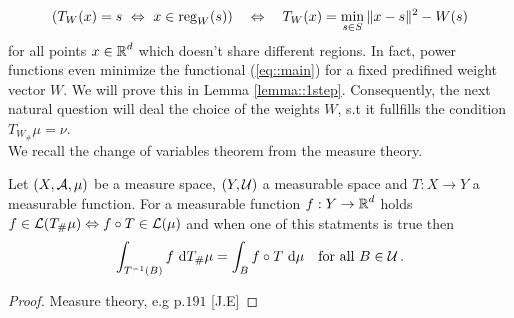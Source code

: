 \documentclass[
     12pt,         %
     a4paper,      %
     BCOR=10mm,     %
     DIV=14,        %
     ]{scrreprt}
\begin{document}
    \begin{align}
        ( T_W(x) = s \  \Leftrightarrow \ x\in \operatorname{reg}_W(s) ) \quad \Leftrightarrow \quad T_W(x) = \min_{s\in S} \|x-s\|^2 - W(s) \label{eq::minimalityPower}
    \end{align}
    for all points $x \in \operatorname{\mathbb{R}}^d$ which doesn't share different regions. In fact, power functions even minimize the functional (\ref{eq::main}) for a fixed predifined weight vector $W$.
    We will prove this in Lemma \ref{lemma::1step}. Consequently, the next natural question will deal the choice of the weights $W$, s.t it fullfills the condition $T_{W_{\#}}\mu = \nu$.\\[8pt]
    \indent We recall the change of variables theorem from the measure theory. 
    \begin{thm*}
         Let $(X, \operatorname{\mathcal{A}}, \mu)$ be a measure space, $(Y, \operatorname{\mathcal{U}})$ a measurable space and $T: X \to Y $ a measurable function.
         For a measurable function $f : Y \to \operatorname{\mathbb{R}}^d $ holds $f\in \operatorname{\mathcal{L}}(T_\#\mu) \Leftrightarrow f \circ T \in \operatorname{\mathcal{L}}(\mu) $ and when one of this statments is true then 
         \begin{align} \label{eq::transformel}
             \int_{T^{-1}(B)} f \ {\operatorname{{\mathrm{d}}}} T_{\#}\mu = \int_{B} f \circ T \ {\operatorname{{\mathrm{d}}}} \mu \quad \text{for all } B\in \operatorname{\mathcal{U}}.
         \end{align}
    \end{thm*}
    \begin{proof}[Proof]
    Measure theory, e.g p.$191$ [J.E]
    \end{proof}
    
\end{document}
